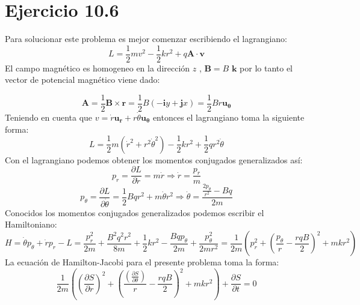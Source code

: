 \documentclass[letterpaper,10pt]{article}
\begin{document}
\section*{Ejercicio 10.6}
Para solucionar este problema es mejor comenzar escribiendo el lagrangiano:
$$L=\frac{1}{2}m v^2-\frac{1}{2}k r^2+q \textbf{A}\cdot \textbf{v}$$
El campo magn\'etico es homogeneo en la direcci\'on $z$ , $\textbf{B}=B \textbf{ k}$ por lo tanto el vector de potencial magn\'etico viene dado:

$$\textbf{A}=\frac{1}{2}\textbf{B}\times \textbf{r}=\frac{1}{2}B \left(-\textbf{i} y+\textbf{j} x \right)=\frac{1}{2}B r \mathbf{u_{\theta}}$$
Teniendo en cuenta que $v=\dot r \mathbf{u_{r}}+r \dot \theta \mathbf{u_{\theta}} $ entonces el lagrangiano toma la siguiente forma:
$$L=\frac{1}{2} m (\dot r^2+r^2 \dot \theta^2)-\frac{1}{2}k r^2 +\frac{1}{2} q r^2 \dot \theta$$
Con el lagrangiano podemos obtener los momentos conjugados generalizados as\'i:
$$p_r=\frac{\partial L}{\partial \dot r}=m \dot r \Rightarrow \dot r=\frac{p_r}{m}$$
$$p_{\theta}= \frac{\partial L}{\partial \dot \theta}=\frac{1}{2} B q r^2+m \dot \theta r^2\Rightarrow \dot \theta =\frac{\frac{2 p_\theta}{r^2}-B q}{2m}$$
Conocidos los momentos conjugados generalizados podemos escribir el Hamiltoniano:
$$H=\dot \theta p_\theta+\dot r p_r-L=\frac{p_r^2}{2 m}+\frac{B^2 q^2 r^2}{8m}+\frac{1}{2} k r^2-\frac{B q p_\theta}{2 m}+\frac{p_\theta^2}{2 m r^2}=\frac{1}{2m}\left(p_r^2+\left(\frac{p_\theta}{r}-\frac{r q B}{2} \right)^2 + m k r^2\right)$$
La ecuaci\'on de Hamilton-Jacobi para el presente problema toma la forma:
$$
\frac{1}{2m}\left(\left( \frac{\partial S}{\partial r }\right)^2+\left(\frac{\left( \frac{\partial S}{\partial \theta}\right)}{r}-\frac{r q B}{2} \right)^2 + m k r^2\right) +\frac{\partial S }{\partial t}=0$$
\end{document}
